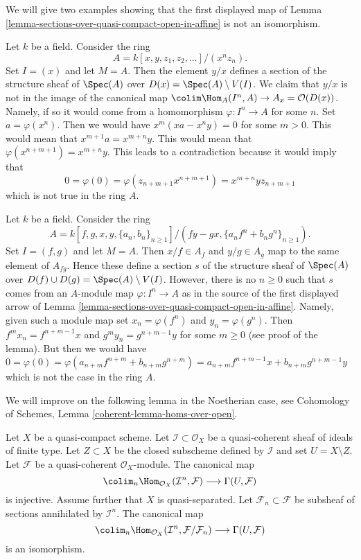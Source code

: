 \begin{example}
\label{example-does-not-work-in-general}
We will give two examples showing that the first displayed map of
Lemma \ref{lemma-sections-over-quasi-compact-open-in-affine}
is not an isomorphism.

\medskip\noindent
Let $k$ be a field. Consider the ring
$$
A = k[x, y, z_1, z_2, \ldots]/(x^nz_n).
$$
Set $I = (x)$ and let $M = A$. Then the element $y/x$ defines a section of
the structure sheaf of $\Spec(A)$ over $D(x) = \Spec(A) \setminus V(I)$.
We claim that $y/x$ is not in the image of the canonical map
$\colim \Hom_A(I^n, A) \to A_x = \mathcal{O}(D(x))$. Namely, if so it
would come from a homomorphism $\varphi : I^n \to A$ for some $n$.
Set $a = \varphi(x^n)$. Then we would have $x^m(xa - x^ny) = 0$ for some
$m > 0$. This would mean that $x^{m + 1}a = x^{m + n}y$. This would mean that
$\varphi(x^{n + m + 1}) = x^{m + n}y$. This leads to a contradiction
because it would imply that
$$
0 = \varphi(0) = \varphi(z_{n + m + 1} x^{n + m + 1}) =
x^{m + n}y z_{n + m + 1}
$$
which is not true in the ring $A$.

\medskip\noindent
Let $k$ be a field. Consider the ring
$$
A = k[f, g, x, y, \{a_n, b_n\}_{n \geq 1}]/
(fy - gx, \{a_nf^n + b_ng^n\}_{n \geq 1}).
$$
Set $I = (f, g)$ and let $M = A$. Then $x/f \in A_f$ and $y/g \in A_g$
map to the same element of $A_{fg}$. Hence these define a section $s$
of the structure sheaf of $\Spec(A)$ over
$D(f) \cup D(g) = \Spec(A) \setminus V(I)$. However, there is no
$n \geq 0$ such that $s$ comes from an $A$-module map
$\varphi : I^n \to A$ as in the source of the first displayed arrow
of Lemma \ref{lemma-sections-over-quasi-compact-open-in-affine}.
Namely, given such a module map set
$x_n = \varphi(f^n)$ and $y_n = \varphi(g^n)$.
Then $f^mx_n = f^{n + m - 1}x$ and
$g^my_n = g^{n + m - 1}y$ for some $m \geq 0$ (see proof
of the lemma). But then we would have
$0 = \varphi(0) =
\varphi(a_{n + m}f^{n + m} + b_{n + m}g^{n + m}) =
a_{n + m}f^{n + m - 1}x + b_{n + m}g^{n + m - 1}y$ which is not the case
in the ring $A$.
\end{example}

\noindent
We will improve on the following lemma in the Noetherian case, see
Cohomology of Schemes, Lemma \ref{coherent-lemma-homs-over-open}.

\begin{lemma}
\label{lemma-sections-over-quasi-compact-open}
Let $X$ be a quasi-compact scheme.
Let $\mathcal{I} \subset \mathcal{O}_X$ be a
quasi-coherent sheaf of ideals of finite type.
Let $Z \subset X$ be the closed subscheme
defined by $\mathcal{I}$ and set $U = X \setminus Z$.
Let $\mathcal{F}$ be a quasi-coherent $\mathcal{O}_X$-module.
The canonical map
$$
\colim_n \Hom_{\mathcal{O}_X}(\mathcal{I}^n,
\mathcal{F})
\longrightarrow
\Gamma(U, \mathcal{F})
$$
is injective. Assume further that $X$ is quasi-separated.
Let $\mathcal{F}_n \subset \mathcal{F}$
be subsheaf of sections annihilated by $\mathcal{I}^n$.
The canonical map
$$
\colim_n \Hom_{\mathcal{O}_X}(\mathcal{I}^n,
\mathcal{F}/\mathcal{F}_n)
\longrightarrow
\Gamma(U, \mathcal{F})
$$
is an isomorphism.
\end{lemma}

